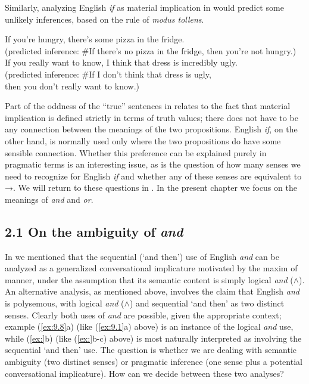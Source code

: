 Similarly, analyzing English \textit{if} as material implication in  would predict some unlikely inferences, based on the rule of \textit{modus tollens}.


\ea \label{ex:9.7}
\ea If you’re hungry, there’s some pizza in the fridge.\\
  (predicted inference: \#If there’s no pizza in the fridge, then you’re not hungry.)\\
\ex If you really want to know, I think that dress is incredibly ugly.\\
  (predicted inference: \#If I don’t think that dress is ugly,\\
    then you don’t really want to know.)
                       \z
\z


Part of the oddness of the “true” sentences in  relates to the fact that material implication is defined strictly in terms of truth values; there does not have to be any connection between the meanings of the two propositions. English \textit{if}, on the other hand, is normally used only where the two propositions do have some sensible connection. Whether this preference can be explained purely in pragmatic terms is an interesting issue, as is the question of how many senses we need to recognize for English \textit{if} and whether any of these senses are equivalent to →. We will return to these questions in . In the present chapter we focus on the meanings of \textit{and} and \textit{or}.


\subsection{2.1 On the ambiguity of \textit{and}}\label{sec:} 

In  we mentioned that the sequential (‘and then’) use of English \textit{and} can be analyzed as a generalized conversational implicature motivated by the maxim of manner, under the assumption that its semantic content is simply logical \textit{and} ($\wedge$). An alternative analysis, as mentioned above, involves the claim that English \textit{and} is polysemous, with logical \textit{and} ($\wedge$) and sequential ‘and then’ as two distinct senses. Clearly both uses of \textit{and} are possible, given the appropriate context; example (\ref{ex:9.8}a) (like (\ref{ex:9.1}a) above) is an instance of the logical \textit{and} use, while (\ref{ex:}b) (like (\ref{ex:}b-c) above) is most naturally interpreted as involving the sequential ‘and then’ use. The question is whether we are dealing with semantic ambiguity (two distinct senses) or pragmatic inference (one sense plus a potential conversational implicature). How can we decide between these two analyses?


